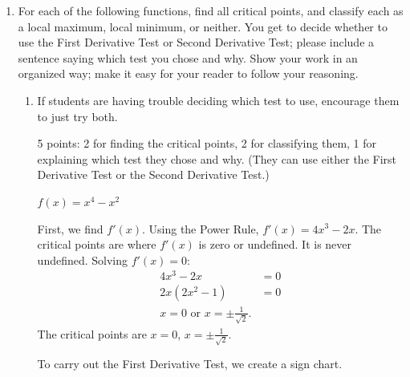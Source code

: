 \documentclass{article}
\begin{document}
\begin{enumerate}
\begin{enumerate}
    \begin{solution} %
      We need to use the First Derivative Test instead of the Second Derivative Test for critical points $c$ where $f''(c)$ is either 0 or undefined. (In these cases, the Second Derivative Test gives no information.)
    \end{solution}

  \end{enumerate}

\item For each of the following functions, find all critical points, and classify each as a local maximum, local minimum, or neither. You get to decide whether to use the First Derivative Test or Second Derivative Test; please include a sentence saying which test you chose and why. Show your work in an organized way; make it easy for your reader to follow your reasoning. 

  \begin{enumerate}
  \item

    \begin{workshop}
      If students are having trouble deciding which test to use, encourage them to just try both. 
    \end{workshop}

    \begin{grading}
      5 points: 2 for finding the critical points, 2 for classifying them, 1 for explaining which test they chose and why. (They can use either the First Derivative Test or the Second Derivative Test.)
    \end{grading}

    \begin{problem}[\nstretch{1.5}]
      $f(x) = x^4 - x^2$
    \end{problem}

    \begin{solution}
      First, we find $f'(x)$. Using the Power Rule, $f'(x)=4x^3-2x$. The critical points
      are where $f'(x)$ is zero or undefined. It is never undefined. Solving $f'(x)=0$:
      \begin{align*}
        4x^3-2x &= 0 \\
        2x(2x^2-1) &= 0 \\
        x = 0 \text{ or } x = \pm \frac{1}{\sqrt{2}}.
      \end{align*}
      The critical points are $x=0$, $x=\pm\frac{1}{\sqrt{2}}$.

      To carry out the First Derivative Test, we create a sign chart.


\end{solution}
\end{enumerate}
\end{enumerate}
\end{document}
